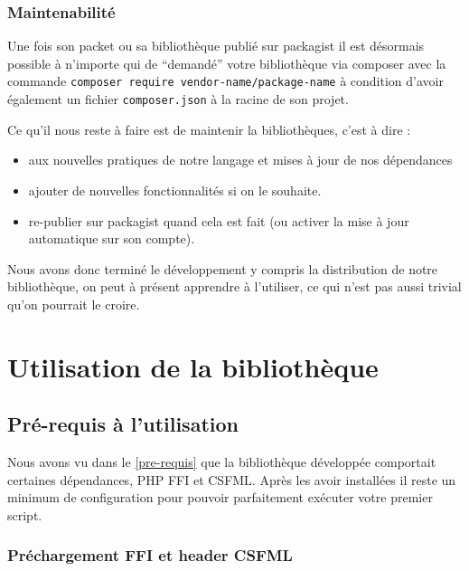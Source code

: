 \documentclass[11pt,a4paper,krantz2,11pt,oneside]{krantz}
\providecommand{\tightlist}{%
  \setlength{\itemsep}{0pt}\setlength{\parskip}{0pt}}
\begin{document}
\hypertarget{maintenabilituxe9}{%
\subsection{Maintenabilité}\label{maintenabilituxe9}}

Une fois son packet ou sa bibliothèque publié sur packagist il est désormais possible à n'importe qui de ``demandé'' votre bibliothèque via composer avec la commande \texttt{composer\ require\ vendor-name/package-name} à condition d'avoir également un fichier \texttt{composer.json} à la racine de son projet.

Ce qu'il nous reste à faire est de maintenir la bibliothèques, c'est à dire :

\begin{itemize}
\tightlist
\item
  aux nouvelles pratiques de notre langage et mises à jour de nos dépendances
\item
  ajouter de nouvelles fonctionnalités si on le souhaite.
\item
  re-publier sur packagist quand cela est fait (ou activer la mise à jour automatique sur son compte).
\end{itemize}

Nous avons donc terminé le développement y compris la distribution de notre bibliothèque, on peut à présent apprendre à l'utiliser, ce qui n'est pas aussi trivial qu'on pourrait le croire.

\hypertarget{utils}{%
\chapter{Utilisation de la bibliothèque}\label{utils}}

\hypertarget{utils-pre-requis}{%
\section{Pré-requis à l'utilisation}\label{utils-pre-requis}}

Nous avons vu dans le \ref{pre-requis} que la bibliothèque développée comportait certaines dépendances, PHP FFI et CSFML. Après les avoir installées il reste un minimum de configuration pour pouvoir parfaitement exécuter votre premier script.

\hypertarget{pruxe9chargement-ffi-et-header-csfml}{%
\subsection{Préchargement FFI et header CSFML}\label{pruxe9chargement-ffi-et-header-csfml}}
\end{document}
